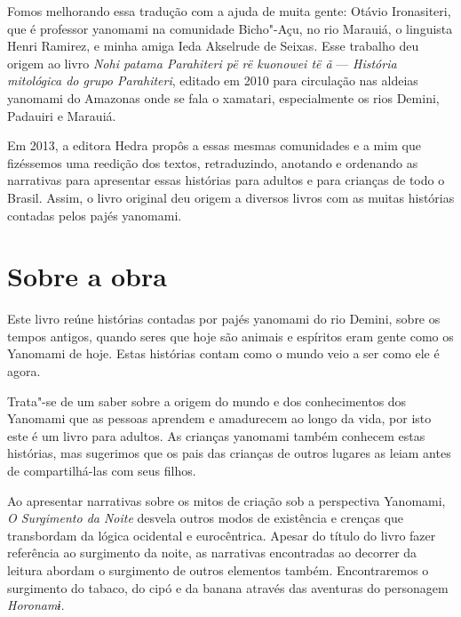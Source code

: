 Fomos melhorando essa tradução com a ajuda de muita gente: Otávio
Ironasiteri, que é professor yanomami na comunidade Bicho"-Açu, no rio
Marauiá, o linguista Henri Ramirez, e minha amiga Ieda Akselrude de
Seixas. Esse trabalho deu origem ao livro \emph{Nohi patama Parahiteri
pë rë kuonowei të ã} --- \emph{História mitológica do grupo Parahiteri},
editado em 2010 para circulação nas aldeias yanomami do Amazonas onde se
fala o xamatari, especialmente os rios Demini, Padauiri e Marauiá. 
 
Em 2013, a editora Hedra propôs a essas mesmas comunidades e a mim que
fizéssemos uma reedição dos textos, retraduzindo, anotando e ordenando as
narrativas para apresentar essas histórias para adultos e para crianças de todo
o Brasil. Assim, o livro original deu origem a diversos livros com as muitas
histórias contadas pelos pajés yanomami.  

\section{Sobre a obra}

Este livro reúne histórias contadas por pajés yanomami do rio Demini, sobre os tempos antigos, quando seres que hoje são animais e espíritos eram gente como os Yanomami de hoje. Estas histórias contam como o mundo veio a ser como ele é agora. 

Trata"-se de um saber sobre a origem do mundo e dos conhecimentos dos Yanomami que as pessoas aprendem e amadurecem ao longo da vida, por isto este é um livro para adultos. As crianças yanomami também conhecem estas histórias, mas sugerimos que os pais das crianças de outros lugares as leiam antes de compartilhá-las com seus filhos.


Ao apresentar narrativas sobre os mitos de criação sob a perspectiva
Yanomami, \emph{O Surgimento da Noite} desvela outros modos de existência
e crenças que transbordam da lógica ocidental e eurocêntrica.
Apesar do título do livro fazer referência ao surgimento da noite, as
narrativas encontradas ao decorrer da leitura abordam o surgimento de
outros elementos também. Encontraremos o surgimento do tabaco, do cipó e
da banana através das aventuras do personagem \emph{Horonamɨ.}

